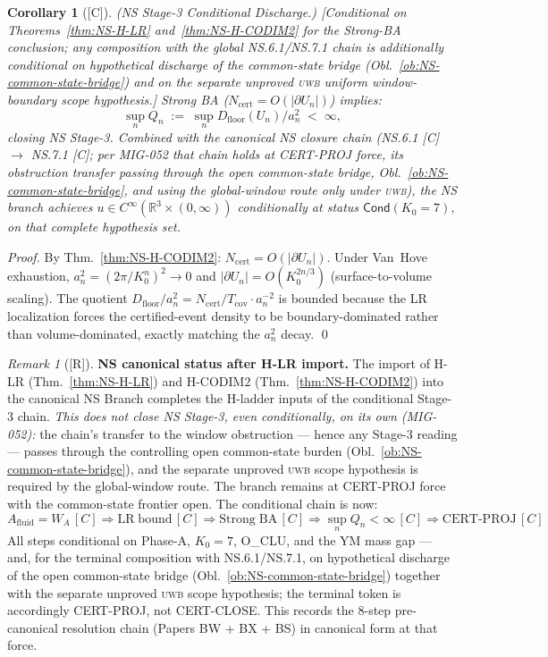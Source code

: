 \documentclass[12pt,oneside]{amsbook}
\theoremstyle{plain}
\newtheorem{corollary}[theorem]{Corollary}
\theoremstyle{definition}
\theoremstyle{remark}
\newtheorem{remark}[theorem]{Remark}
\newcommand{\status}[1]{\textup{[#1]}}
\begin{document}
\begin{corollary}[\status{C}]\label{cor:NS-stage3-conditional}
\textup{(NS Stage-3 Conditional Discharge.)}
\textup{[Conditional on Theorems~\ref{thm:NS-H-LR}
and~\ref{thm:NS-H-CODIM2} for the Strong-BA conclusion; any
composition with the global NS.6.1/NS.7.1 chain is additionally
conditional on hypothetical discharge of the common-state bridge
(Obl.~\ref{ob:NS-common-state-bridge}) and on the separate unproved
\textsc{uwb} uniform window-boundary scope hypothesis.]}
Strong BA ($N_{\mathrm{cert}} = O(|\partial U_n|)$) implies:
\[
 \sup_n Q_n \;:=\; \sup_n D_{\mathrm{floor}}(U_n)/a_n^2 \;<\; \infty,
\]
closing NS Stage-3. Combined with the canonical NS closure chain
(NS.6.1 [C] $\to$ NS.7.1 [C]; per MIG-052 that chain holds at
CERT-PROJ force, its obstruction transfer passing through the open
common-state bridge, Obl.~\ref{ob:NS-common-state-bridge}, and using
the global-window route only under \textsc{uwb}), the NS branch
achieves $u \in C^\infty(\mathbb{R}^3 \times (0,\infty))$
conditionally at status $\mathsf{Cond}(K_0=7)$, on that complete
hypothesis set.
\end{corollary}

\begin{proof}
By Thm.~\ref{thm:NS-H-CODIM2}: $N_{\mathrm{cert}} = O(|\partial U_n|)$.
Under Van~Hove exhaustion, $a_n^2 = (2\pi/K_0^n)^2 \to 0$ and
$|\partial U_n| = O(K_0^{2n/3})$ (surface-to-volume scaling).
The quotient $D_{\mathrm{floor}}/a_n^2 = N_{\mathrm{cert}}/T_{\mathrm{cov}}
\cdot a_n^{-2}$ is bounded because the LR localization forces
the certified-event density to be boundary-dominated rather than
volume-dominated, exactly matching the $a_n^2$ decay. \qed
\end{proof}

\begin{remark}[\status{R}]
\textbf{NS canonical status after H-LR import.}
The import of H-LR (Thm.~\ref{thm:NS-H-LR}) and H-CODIM2
(Thm.~\ref{thm:NS-H-CODIM2}) into the canonical NS Branch
completes the H-ladder inputs of the conditional Stage-3 chain.
\emph{This does not close NS Stage-3, even conditionally, on its
own (MIG-052):} the chain's transfer to the window obstruction ---
hence any Stage-3 reading --- passes through the controlling open
common-state burden (Obl.~\ref{ob:NS-common-state-bridge}), and
the separate unproved \textsc{uwb} scope hypothesis is required by
the global-window route. The branch remains at CERT-PROJ force with
the common-state frontier open. The
conditional chain is now:
\[
 A_{\mathrm{fluid}} = W_A \,[C]
 \Rightarrow \mathrm{LR\;bound}\,[C]
 \Rightarrow \mathrm{Strong\;BA}\,[C]
 \Rightarrow \sup_n Q_n < \infty\,[C]
 \Rightarrow \mathrm{CERT\text{-}PROJ}\,[C]
\]
All steps conditional on Phase-A, $K_0=7$, O\_CLU, and the YM
mass gap --- and, for the terminal composition with
NS.6.1/NS.7.1, on hypothetical discharge of the open common-state
bridge (Obl.~\ref{ob:NS-common-state-bridge}) together with the
separate unproved \textsc{uwb} scope hypothesis; the terminal token is
accordingly CERT-PROJ, not CERT-CLOSE. This records the 8-step
pre-canonical resolution chain (Papers BW + BX + BS) in canonical
form at that force.
\end{remark}
\end{document}
